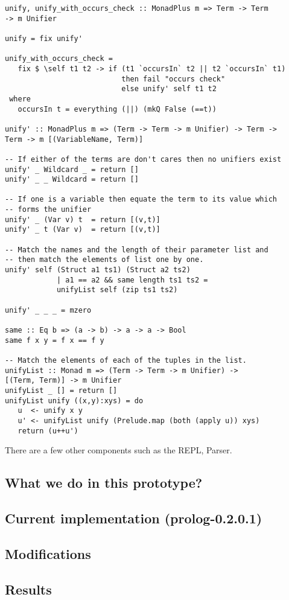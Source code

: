 \documentclass[proposal.tex]{subfiles}
\begin{document}
\begin{verbatim}
unify, unify_with_occurs_check :: MonadPlus m => Term -> Term 
-> m Unifier

unify = fix unify'

unify_with_occurs_check =
   fix $ \self t1 t2 -> if (t1 `occursIn` t2 || t2 `occursIn` t1)
                           then fail "occurs check"
                           else unify' self t1 t2
 where
   occursIn t = everything (||) (mkQ False (==t))

unify' :: MonadPlus m => (Term -> Term -> m Unifier) -> Term -> 
Term -> m [(VariableName, Term)]

-- If either of the terms are don't cares then no unifiers exist
unify' _ Wildcard _ = return []
unify' _ _ Wildcard = return []

-- If one is a variable then equate the term to its value which 
-- forms the unifier
unify' _ (Var v) t  = return [(v,t)]
unify' _ t (Var v)  = return [(v,t)]

-- Match the names and the length of their parameter list and 
-- then match the elements of list one by one. 
unify' self (Struct a1 ts1) (Struct a2 ts2) 
            | a1 == a2 && same length ts1 ts2 = 
            unifyList self (zip ts1 ts2)

unify' _ _ _ = mzero

same :: Eq b => (a -> b) -> a -> a -> Bool
same f x y = f x == f y

-- Match the elements of each of the tuples in the list. 
unifyList :: Monad m => (Term -> Term -> m Unifier) -> 
[(Term, Term)] -> m Unifier
unifyList _ [] = return []
unifyList unify ((x,y):xys) = do
   u  <- unify x y
   u' <- unifyList unify (Prelude.map (both (apply u)) xys)
   return (u++u')
\end{verbatim}  


There are a few other components such as the REPL, Parser. 


\subsection{What we do in this prototype?}


\subsection{Current implementation (prolog-0.2.0.1)}


\subsection{Modifications}


\subsection{Results}
\end{document}
